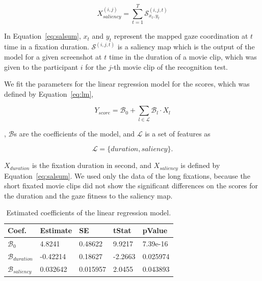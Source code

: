\documentclass[oneside,master]{snueethesis}
\begin{document}
\begin{equation}\label{eq:salsum}
X_{saliency}^{(i,j)} = \sum_{t=1}^{T} \mathcal{S}_{x_{t},y_{t}}^{(i,j,t)}
\end{equation}

In Equation~\ref{eq:salsum}, $x_{t}$ and $y_{t}$ represent the mapped gaze coordination at $t$ time in a fixation duration. $\mathcal{S}^{(i,j,t)}$ is a saliency map which is the output of the model for a given screenshot at $t$ time in the duration of a movie clip, which was given to the participant $i$ for the $j$-th movie clip of the recognition test.

We fit the parameters for the linear regression model for the scores, which was defined by Equation~\ref{eq:lm},

\begin{equation}\label{eq:lm}
Y_{score} = \mathcal{B}_{0} + \sum_{l \in \mathcal{L}} \mathcal{B}_{l} \cdot X_{l}
\end{equation}

\noindent, $\mathcal{B}$s are the coefficients of the model, and $\mathcal{L}$ is a set of features as  

\begin{equation}\label{eq:l}
\mathcal{L} = \{duration, saliency\}.
\end{equation}

$X_{duration}$ is the fixation duration in second, and $X_{saliency}$ is defined by Equation~\ref{eq:salsum}. We used only the data of the long fixations, because the short fixated movie clips did not show the significant differences on the scores for the duration and the gaze fitness to the saliency map.

\begin{table}[ht]
\begin{center} 
\caption[Estimated coefficients of the linear regression model]{Estimated coefficients of the linear regression model.}
\vskip 0.12in
\label{tab:lr-coef} 
\begin{tabular}{lllll} 
\hline
Coef. & Estimate & SE & tStat & pValue \\ 
\hline
$\mathcal{B}_{0}$    &  4.8241   &  0.48622  &  9.9217 &  7.39e-16  \\
$\mathcal{B}_{duration}$ & -0.42214  &  0.18627  & -2.2663 &  0.025974    \\
$\mathcal{B}_{saliency}$ &  0.032642 &  0.015957 &  2.0455 &  0.043893    \\
\hline
\end{tabular} 
\end{center} 
\end{table}
\end{document}
